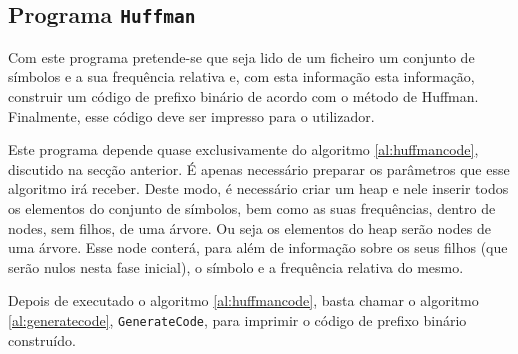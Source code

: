\documentclass{article}
\begin{document}
\subsection{Programa \texttt{Huffman}}

Com este programa pretende-se que seja lido de um ficheiro um conjunto de símbolos e a sua frequência relativa e, com esta informação esta informação, construir um código de prefixo binário de acordo com o método de Huffman. Finalmente, esse código deve ser impresso para o utilizador.

Este programa depende quase exclusivamente do algoritmo \ref{al:huffmancode}, discutido na secção anterior. É apenas necessário preparar os parâmetros que esse algoritmo irá receber. Deste modo, é necessário criar um heap e nele inserir todos os elementos do conjunto de símbolos, bem como as suas frequências, dentro de nodes, sem filhos, de uma árvore. Ou seja os elementos do heap serão nodes de uma árvore. Esse node conterá, para além de informação sobre os seus filhos (que serão nulos nesta fase inicial), o símbolo e a frequência relativa do mesmo.

Depois de executado o algoritmo \ref{al:huffmancode}, basta chamar o algoritmo \ref{al:generatecode}, \texttt{GenerateCode}, para imprimir o código de prefixo binário construído.
\end{document}
